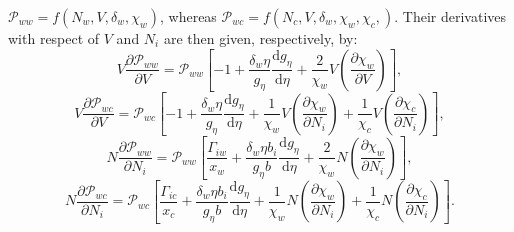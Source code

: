 $\mathcal{P}_{ww} = f \left ( N_w, V, \delta_w, \chi_w\right )$, whereas $\mathcal{P}_{wc} = f \left ( N_c, V, \delta_w, \chi_w ,  \chi_c, \right )$. Their derivatives with respect of $V$ and $N_i$ are then given, respectively, by: 
\begin{equation}
        V \frac{\partial \mathcal{P}_{ww}}{\partial V} = \mathcal{P}_{ww} \left [ -1 + \frac{\delta_w \eta}{g_\eta} \frac{\mathrm{d} g_\eta} {\mathrm{d} \eta} + \frac{2}{\chi_w} V \left ( \frac{\partial \chi_w}{\partial V} \right )\right ],
        \label{dPwwdV}
\end{equation}
\begin{equation}
        V \frac{\partial \mathcal{P}_{wc}}{\partial V} = \mathcal{P}_{wc} \left [ -1 + \frac{\delta_w \eta}{g_\eta} \frac{\mathrm{d} g_\eta} {\mathrm{d} \eta} + \frac{1}{\chi_w} V \left( \frac{\partial \chi_w}{\partial N_i} \right ) + \frac{1}{\chi_c} V \left( \frac{\partial \chi_c}{\partial N_i} \right )\right ],
        \label{dPwcdV}
\end{equation}
\begin{equation}
        N \frac{\partial \mathcal{P}_{ww}}{\partial N_i} = \mathcal{P}_{ww} \left [ \frac{\Gamma_{iw}}{x_w} +  \frac{\delta_w \eta b_i}{g_\eta  b} \frac{\mathrm{d} g_\eta} {\mathrm{d} \eta} + \frac{2}{\chi_w} N \left( \frac{\partial \chi_w}{\partial N_i} \right )\right ],
        \label{dPwwdNi}
\end{equation}
\begin{equation}
        N \frac{\partial \mathcal{P}_{wc}}{\partial N_i} = \mathcal{P}_{wc} \left [\frac{\Gamma_{ic}}{x_c} + \frac{\delta_w \eta b_i}{g_\eta  b} \frac{\mathrm{d} g_\eta} {\mathrm{d} \eta} + \frac{1}{\chi_w} N \left( \frac{\partial \chi_w}{\partial N_i} \right ) +\frac{1}{\chi_c} N \left( \frac{\partial \chi_c}{\partial N_i} \right )\right ]
        \label{dPwcdNi}.
\end{equation}


